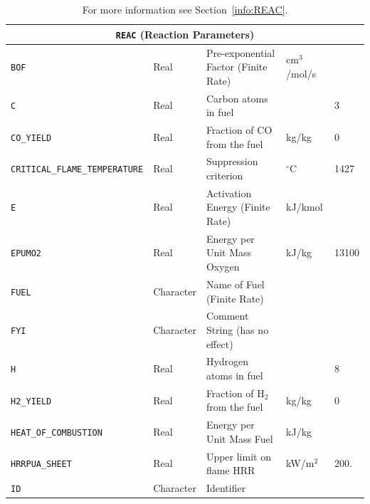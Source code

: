 \documentclass[11pt]{book}
\newcommand{\ct}{\tt\small}
\begin{document}
\begin{table}[H]
\caption{For more information see Section~\ref{info:REAC}.}\label{tbl:REAC}
\noindent
\begin{tabular*}{\textwidth}{@{\extracolsep{\fill}}|l|l|l|l|l|}
\hline
\multicolumn{5}{|c|}{{\ct REAC} (Reaction Parameters)} \\ \hline \hline
{\ct BOF}                                 & Real        & Pre-exponential Factor (Finite Rate)      &   cm$^3$/mol/s    &     \\ \hline
{\ct C}                                   & Real        & Carbon atoms in fuel                      &                   & 3    \\ \hline
{\ct CO\_YIELD}                           & Real        & Fraction of CO from the fuel              & kg/kg             & 0        \\ \hline
{\ct \tiny CRITICAL\_FLAME\_TEMPERATURE}  & Real        & Suppression criterion                     &   $^\circ$C       & 1427    \\ \hline
{\ct E}                                   & Real        & Activation Energy (Finite Rate)           &   kJ/kmol         &     \\ \hline
{\ct EPUMO2}                              & Real        & Energy per Unit Mass Oxygen               &   kJ/kg           & 13100    \\ \hline
{\ct FUEL}                                & Character   & Name of Fuel (Finite Rate)                &                   &     \\ \hline
{\ct FYI}                                 & Character   & Comment String (has no effect)            &                   &     \\ \hline
{\ct H}                                   & Real        & Hydrogen atoms in fuel                    &                   & 8    \\ \hline
{\ct H2\_YIELD}                           & Real        & Fraction of H$_2$ from the fuel           & kg/kg             & 0        \\ \hline
{\ct HEAT\_OF\_COMBUSTION}                & Real        & Energy per Unit Mass Fuel                 & kJ/kg             &         \\ \hline
{\ct HRRPUA\_SHEET}                       & Real        & Upper limit on flame HRR                  & kW/m$^2$          & 200.    \\ \hline
{\ct ID}                                  & Character   & Identifier                                &                   &     \\ \hline

\end{tabular*}
\end{table}
\end{document}
